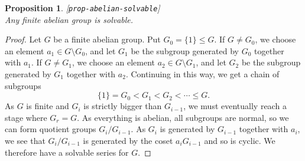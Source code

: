 \documentclass{amsart}
\newcommand{\lbl}[1]{\label{#1}\textup{[\texttt{#1}]}\ \\}
\newcommand{\lbl}{\label}
\newcommand{\sm}        {\setminus}
\renewcommand{\:}{\colon}
\newtheorem{proposition}[theorem]{Proposition}
\theoremstyle{definition}
\begin{document}
\begin{proposition}\lbl{prop-abelian-solvable}
 Any finite abelian group is solvable.
\end{proposition}
\begin{proof}
 Let $G$ be a finite abelian group.  Put $G_0=\{1\}\leq G$.  If
 $G\neq G_0$, we choose an element $a_1\in G\sm G_0$, and let $G_1$ be
 the subgroup generated by $G_0$ together with $a_1$.  If $G\neq G_1$,
 we choose an element $a_2\in G\sm G_1$, and let $G_2$ be the subgroup
 generated by $G_1$ together with $a_2$.  Continuing in this way, we
 get a chain of subgroups
 \[ \{1\} = G_0 < G_1 < G_2 < \dotsb \leq G. \]
 As $G$ is finite and $G_i$ is strictly bigger than $G_{i-1}$, we must
 eventually reach a stage where $G_r=G$.  As everything is abelian,
 all subgroups are normal, so we can form quotient groups
 $G_i/G_{i-1}$.  As $G_i$ is generated by $G_{i-1}$ together with
 $a_i$, we see that $G_i/G_{i-1}$ is generated by the coset
 $a_iG_{i-1}$ and so is cyclic.  We therefore have a solvable series
 for $G$.
\end{proof}
\end{document}
